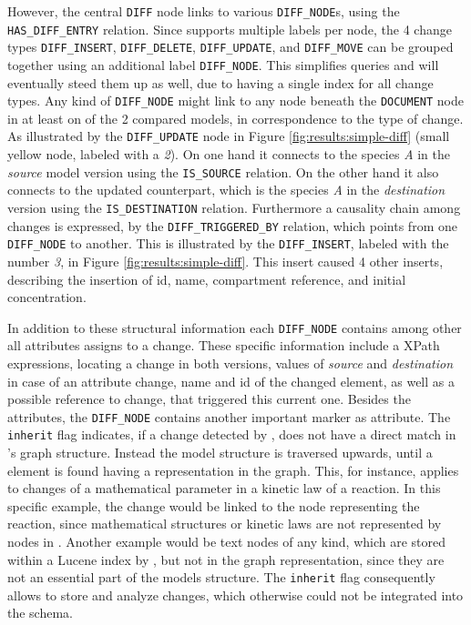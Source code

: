 However, the central \texttt{DIFF} node links to various \texttt{DIFF\_NODE}s, using the \texttt{HAS\_DIFF\_ENTRY} relation. Since \neoj supports multiple labels per node, the 4 change types \texttt{DIFF\_INSERT}, \texttt{DIFF\_DELETE}, \texttt{DIFF\_UPDATE}, and \texttt{DIFF\_MOVE} can be grouped together using an additional label \texttt{DIFF\_NODE}. This simplifies queries and will eventually steed them up as well, due to having a single index for all change types.
Any kind of \texttt{DIFF\_NODE} might link to any node beneath the \texttt{DOCUMENT} node in at least on of the 2 compared models, in correspondence to the type of change.
As illustrated by the \texttt{DIFF\_UPDATE} node in Figure \ref{fig:results:simple-diff} (small yellow node, labeled with a \emph{2}). On one hand it connects to the species \emph{A} in the \emph{source} model version using the \texttt{IS\_SOURCE} relation. On the other hand it also connects to the updated counterpart, which is the species \emph{A} in the \emph{destination} version using the \texttt{IS\_DESTINATION} relation.
Furthermore a causality chain among changes is expressed, by the \texttt{DIFF\_TRIGGERED\_BY} relation, which points from one \texttt{DIFF\_NODE} to another. This is illustrated by the \texttt{DIFF\_INSERT}, labeled with the number \emph{3}, in Figure \ref{fig:results:simple-diff}. This insert caused 4 other inserts, describing the insertion of id, name, compartment reference, and initial concentration.

In addition to these structural information each \texttt{DIFF\_NODE} contains among other all attributes \bives assigns to a change. These \bives specific information include a XPath expressions, locating a change in both versions, values of \emph{source} and \emph{destination} in case of an attribute change, name and id of the changed element, as well as a possible reference to change, that triggered this current one.
Besides the \bives attributes, the \texttt{DIFF\_NODE} contains another important marker as attribute.
The \texttt{inherit} flag indicates, if a change detected by \bives, does not have a direct match in \masymos's graph structure. Instead the model structure is traversed  upwards, until a element is found having a representation in the \masymos graph.
This, for instance, applies to changes of a mathematical parameter in a kinetic law of a reaction. In this specific example, the change would be linked to the node representing the reaction, since mathematical structures or kinetic laws are not represented by nodes in \masymos. Another example would be text nodes of any kind, which are stored within a Lucene index by \masymos, but not in the graph representation, since they are not an essential part of the models structure.
The \texttt{inherit} flag consequently allows to store and analyze changes, which otherwise could not be integrated into the schema.

